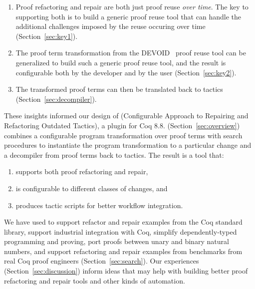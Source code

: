 \begin{enumerate}
\item Proof refactoring and repair are both just 
proof reuse %
\textit{over time}. The key to supporting both is to build a generic proof reuse
tool that can handle the additional challenges imposed by the reuse occuring over time (Section~\ref{sec:key1}). 
\item The proof term transformation from the \textsc{DEVOID}~\cite{Ringer2019} proof reuse tool can be generalized
to build such a generic proof reuse tool, and the result is configurable both by the developer and by the user (Section~\ref{sec:key2}).
\item The transformed proof terms can then be translated back to tactics (Section~\ref{sec:decompiler}).
\end{enumerate}

These insights informed our design of 
\toolname (Configurable Approach to Repairing and Refactoring Outdated Tactics), a plugin for Coq 8.8.
\toolname (Section~\ref{sec:overview}) combines a configurable program transformation over proof terms %
with search procedures to instantiate the program transformation to a particular change
and a decompiler from proof terms back to tactics.
The result is a tool that:

\begin{enumerate}
\item supports both proof refactoring and repair,
\item is configurable to different classes of changes, and
\item produces tactic scripts for better workflow integration.
\end{enumerate}
We have used \toolname to support refactor and repair examples from the Coq standard library,
support industrial integration with Coq,
simplify dependently-typed programming and proving,
port proofs between unary and binary natural numbers,
and support refactoring and repair examples from benchmarks from real Coq proof engineers (Section~\ref{sec:search}).
Our experiences (Section~\ref{sec:discussion}) inform ideas that may help with building better
proof refactoring and repair tools and other kinds of automation.

